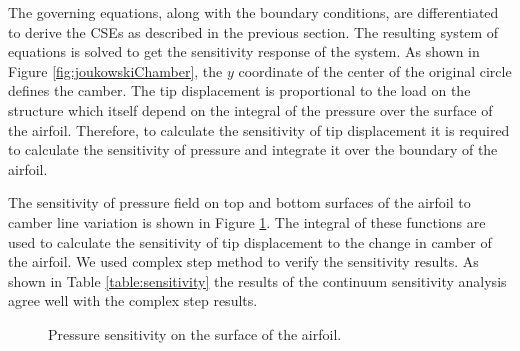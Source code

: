\documentclass[12pt]{aiaa-pretty}
\begin{document}
The governing equations, along with the boundary conditions, are differentiated to derive the CSEs as described in the previous section. The resulting system of equations is solved to get the sensitivity response of the system. As shown in Figure \ref{fig:joukowskiChamber}, the $y$ coordinate of the center of the original circle defines the camber. The tip displacement is proportional to the load on the structure which itself depend on the integral of the pressure over the surface of the airfoil. Therefore, to calculate the sensitivity of tip displacement it is required to calculate the sensitivity of pressure and integrate it over the boundary of the airfoil.

The sensitivity of pressure field on top and bottom surfaces of the airfoil to camber line variation is shown in Figure \ref{fig:joukowskiChamberSensitivity}. The integral of these functions are used to calculate the sensitivity of tip displacement to the change in camber of the airfoil. We used complex step method to verify the sensitivity results. As shown in Table \ref{table:sensitivity} the results of the continuum sensitivity analysis agree well with the complex step results.

%
	\begin{figure}[H]
		\centering
		\quad
		\caption{Pressure sensitivity on the surface of the airfoil.}
		\label{fig:joukowskiChamberSensitivity}
	\end{figure}
%
\end{document}
